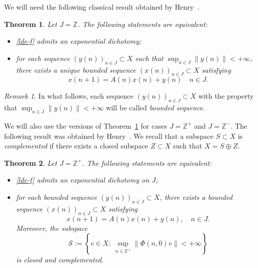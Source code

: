 \documentclass[11pt,reqno,a4paper]{amsart}
\theoremstyle{plain}
\numberwithin{equation}{section}
\newtheorem{theorem}{Theorem}
\theoremstyle{remark}
\newtheorem{remark}{Remark}
\def\Z{\mathbb{Z}}
\begin{document}
We will need the following classical result obtained by Henry~\cite[Theorem 7.6.5]{H}.
\begin{theorem}\label{Hthm}
Let $J=\Z$. The following statements are equivalent:
\begin{itemize}
\item[(i)] \eqref{lde-f} admits an exponential dichotomy;
\item[(ii)] for each sequence $(y(n))_{n\in J}\subset X$ such that 
$\sup_{n\in J}\|y(n)\|<+\infty$, there exists a unique bounded sequence $(x(n))_{n\in J} \subset X$ satisfying
\begin{equation}\label{ADM-1}
x(n+1)=A(n)x(n)+y(n) \quad n\in J.
\end{equation}
\end{itemize}
\end{theorem}
\begin{remark}
In what follows, each sequence $(y(n))_{n\in J}\subset X$ with the property that $\sup_{n\in J}\|y(n)\|<+\infty$ will be called \emph{bounded sequence}.
\end{remark}
We will also use the versions of Theorem~\ref{Hthm} for cases $J=\Z^+$ and $J= \Z^-$. The following result was obtained by Henry~\cite[Corollary 1.10]{H1}. We recall that a 
subspace $S\subset X$ is \emph{complemented} if there exists a closed subspace $Z\subset X$ such that $X=S\oplus Z$.
\begin{theorem}\label{Hthm2}
    Let $J=\Z^+$. The following statements are equivalent:
  \begin{itemize}
\item[(i)] \eqref{lde-f} admits an exponential dichotomy on $J$;
\item[(ii)] for each bounded sequence $(y(n))_{n\in J}\subset X$, there exists a bounded sequence $(x(n))_{n\in J} \subset X$ satisfying
\begin{equation}\label{ADM2-2}
x(n+1)=A(n)x(n)+y(n), \quad n\in J.
\end{equation}
Moreover, the subspace
\begin{equation}\label{bndsubs}
\mathcal S:=\left \{ v\in X: \ \sup_{n\in \Z^+}\|\Phi(n, 0)v\|<+\infty \right \}
\end{equation}
is closed and complemented. 
\end{itemize}  
\end{theorem}
\end{document}
